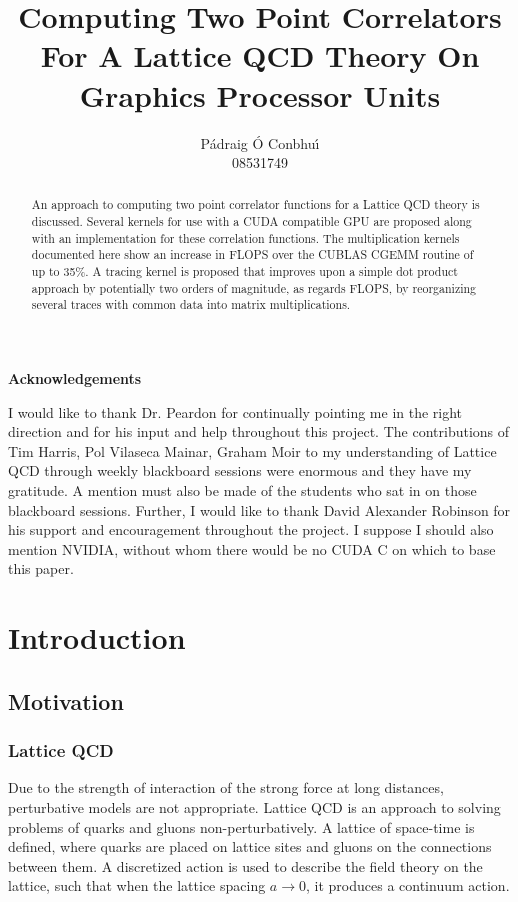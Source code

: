 \documentclass[a4paper,12pt]{report}
\title{Computing Two Point Correlators For A Lattice QCD Theory On Graphics Processor Units}
\author{P\'adraig \'O Conbhu\'\i\\08531749}
\makeatletter
\def\flops{{FLOPS}}
\newcommand\ackname{Acknowledgements}
\newenvironment{acknowledgements}{%
      \titlepage
      \null\vfil
      \@beginparpenalty\@lowpenalty
      \begin{center}%
        \bfseries \ackname
        \@endparpenalty\@M
      \end{center}}%
     {\par\vfil\null\endtitlepage}
\newenvironment{acknowledgements}{%
      \if@twocolumn
        \section*{\abstractname}%
      \else
        \small
        \begin{center}%
          {\bfseries \ackname\vspace{-.5em}\vspace{\z@}}%
        \end{center}%
        \quotation
      \fi}
      {\if@twocolumn\else\endquotation\fi}
\makeatother
\begin{document}
\maketitle


\begin{abstract}
An approach to computing two point correlator functions for a Lattice QCD theory is discussed.
Several kernels for use with a CUDA compatible GPU are proposed along with an implementation for these correlation functions.
The multiplication kernels documented here show an increase in \flops{} over the CUBLAS CGEMM routine of up to 35\%.
A tracing kernel is proposed that improves upon a simple dot product approach by potentially two orders of magnitude, as regards \flops{}, by reorganizing several traces with common data into matrix multiplications.
\end{abstract}

\begin{acknowledgements}
I would like to thank Dr. Peardon for continually pointing me in the right direction and for his input and help throughout this project.
The contributions of Tim Harris, Pol Vilaseca Mainar, Graham Moir to my understanding of Lattice QCD through weekly blackboard sessions were enormous and they have my gratitude.
A mention must also be made of the students who sat in on those blackboard sessions.
Further, I would like to thank David Alexander Robinson for his support and encouragement throughout the project.
I suppose I should also mention NVIDIA, without whom there would be no CUDA C on which to base this paper.
\end{acknowledgements}


\tableofcontents



\onehalfspacing

\chapter{Introduction}


\section{Motivation}

\subsection{Lattice QCD}
Due to the strength of interaction of the strong force at long distances, perturbative models are not appropriate.
Lattice QCD is an approach to solving problems of quarks and gluons non-perturbatively\cite{Lattice_Methods}.
A lattice of space-time is defined, where quarks are placed on lattice sites and gluons on the connections between them.
A discretized action is used to describe the field theory on the lattice, such that when the lattice spacing $a \rightarrow 0$, it produces a continuum action.
\end{document}
